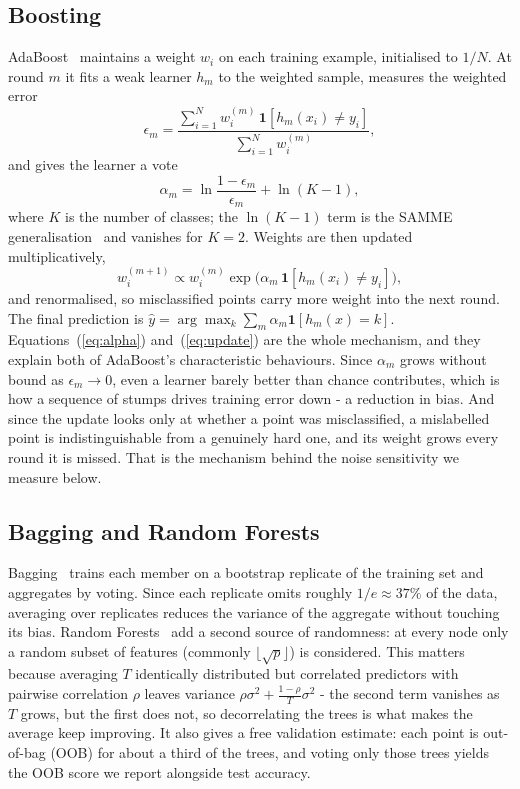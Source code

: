 \documentclass[conference]{IEEEtran}
\begin{document}
\subsection{Boosting}
AdaBoost~\cite{freund1997decision} maintains a weight $w_i$ on each
training example, initialised to $1/N$.  At round $m$ it fits a weak
learner $h_m$ to the weighted sample, measures the weighted error
\begin{equation}
\epsilon_m = \frac{\sum_{i=1}^{N} w_i^{(m)}\,
                   \mathbf{1}[h_m(x_i) \neq y_i]}
                  {\sum_{i=1}^{N} w_i^{(m)}},
\label{eq:err}
\end{equation}
and gives the learner a vote
\begin{equation}
\alpha_m = \ln\frac{1-\epsilon_m}{\epsilon_m} + \ln(K-1),
\label{eq:alpha}
\end{equation}
where $K$ is the number of classes; the $\ln(K-1)$ term is the SAMME
generalisation~\cite{hastie2009elements} and vanishes for $K=2$.  Weights
are then updated multiplicatively,
\begin{equation}
w_i^{(m+1)} \propto w_i^{(m)} \exp\!\big(\alpha_m\,
                    \mathbf{1}[h_m(x_i) \neq y_i]\big),
\label{eq:update}
\end{equation}
and renormalised, so misclassified points carry more weight into the next
round.  The final prediction is
$\hat{y} = \arg\max_k \sum_m \alpha_m \mathbf{1}[h_m(x)=k]$.
Equations~(\ref{eq:alpha}) and~(\ref{eq:update}) are the whole mechanism,
and they explain both of AdaBoost's characteristic behaviours.  Since
$\alpha_m$ grows without bound as $\epsilon_m \to 0$, even a learner barely
better than chance contributes, which is how a sequence of stumps drives
training error down - a reduction in bias.  And since the update looks
only at whether a point was misclassified, a mislabelled point is
indistinguishable from a genuinely hard one, and its weight grows every
round it is missed.  That is the mechanism behind the noise sensitivity we
measure below.

\subsection{Bagging and Random Forests}
Bagging~\cite{breiman1996bagging} trains each member on a bootstrap
replicate of the training set and aggregates by voting.  Since each
replicate omits roughly $1/e \approx 37\%$ of the data, averaging over
replicates reduces the variance of the aggregate without touching its
bias.  Random Forests~\cite{breiman2001random} add a second source of
randomness: at every node only a random subset of features (commonly
$\lfloor\sqrt{p}\rfloor$) is considered.  This matters because averaging
$T$ identically distributed but correlated predictors with pairwise
correlation $\rho$ leaves variance $\rho\sigma^2 + \frac{1-\rho}{T}\sigma^2$
- the second term vanishes as $T$ grows, but the first does not, so
decorrelating the trees is what makes the average keep improving.  It also
gives a free validation estimate: each point is out-of-bag (OOB) for about
a third of the trees, and voting only those trees yields the OOB score we
report alongside test accuracy.
\end{document}
